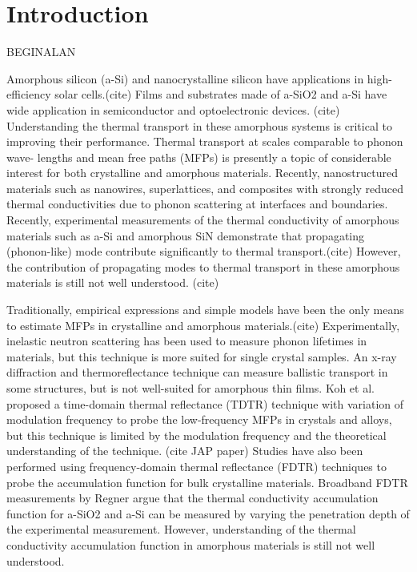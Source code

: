 \documentclass[aps,prb,twocolumn,superscriptaddress,footinbib,amsmath,amssymb,floatfix]{revtex4}
\begin{document}
\section{\label{S:Introduction}Introduction}

BEGINALAN

Amorphous silicon (a-Si) and nanocrystalline silicon have applications 
in high-efficiency solar cells.(cite) 
Films and substrates made of a-SiO2 and a-Si have wide application in 
semiconductor and optoelectronic devices.
(cite) Understanding the thermal transport in these amorphous systems 
is critical to improving their performance. 
Thermal transport at scales comparable to phonon wave-
lengths and mean free paths (MFPs) is presently a topic of
considerable interest for both crystalline and amorphous materials.
\cite{cahill_nanoscale_2003,
yu_reduction_2010,hochbaum_enhanced_2008,pernot_precise_2010}
Recently, nanostructured materials
such as nanowires, superlattices, and composites with
strongly reduced thermal conductivities due to phonon
scattering at interfaces and boundaries.
\cite{hochbaum_enhanced_2008,pernot_precise_2010,
boukai_silicon_2008,poudel_high-thermoelectric_2008} Recently, 
experimental measurements of the thermal conductivity of amorphous 
materials such as a-Si and amorphous SiN demonstrate that 
propagating (phonon-like) mode contribute significantly to thermal 
transport.(cite) However, the contribution of propagating modes to 
thermal 
transport in these amorphous materials is still not well understood.
(cite)

Traditionally, empirical expressions and
simple models have been the only means
to estimate MFPs in crystalline\cite{holland_analysis_1963} 
and amorphous materials.(cite)   
Experimentally, inelastic neutron scattering has been
used to measure phonon lifetimes in materials,
but this technique is more suited for single crystal samples.
\cite{christianson_phonon_2008} 
An x-ray diffraction and thermoreflectance technique
can measure ballistic transport in some structures, but is 
not well-suited for amorphous thin films.
\cite{highland_ballistic-phonon_2007} 
Koh et al. proposed a time-domain thermal reflectance (TDTR) 
technique with variation of
modulation frequency to probe the low-frequency MFPs in 
crystals and alloys,
\cite{koh_frequency_2007} 
but this technique is limited by the modulation frequency 
and the theoretical understanding of the technique.
(cite JAP paper) 
Studies have also been performed using  
frequency-domain thermal reflectance (FDTR) techniques 
to probe the accumulation function for bulk 
crystalline materials.\cite{minnich_thermal_2011,yang_mean_2013} 
Broadband FDTR measurements by Regner argue that the thermal 
conductivity accumulation function for a-SiO2 and a-Si  
can be measured by varying the penetration depth of the 
experimental measurement.\cite{regner_broadband_2013}
However, understanding 
of the thermal conductivity accumulation function in amorphous 
materials is still not well understood.
\cite{feldman_thermal_1993,cahill_thermal_1994,
feldman_numerical_1999,liu_high_2009,yang_anomalously_2010,
he_thermal_2011}
\end{document}
